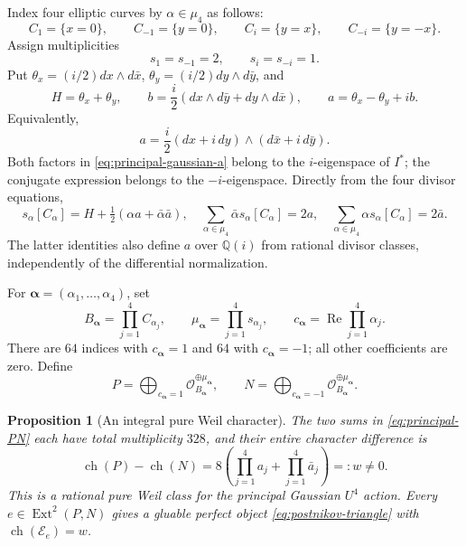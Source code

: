 \documentclass[11pt]{article}
\newtheorem{proposition}[theorem]{Proposition}
\theoremstyle{definition}
\theoremstyle{remark}
\begin{document}
Index four elliptic curves by $\alpha\in\mu_4$ as follows:
\[
 C_1=\{x=0\},\qquad C_{-1}=\{y=0\},\qquad
 C_i=\{y=x\},\qquad C_{-i}=\{y=-x\}.
\]
Assign multiplicities
\[
 s_1=s_{-1}=2,\qquad s_i=s_{-i}=1.
\]
Put $\theta_x=(i/2)dx\wedge d\bar x$,
$\theta_y=(i/2)dy\wedge d\bar y$, and
\[
 H=\theta_x+\theta_y,\qquad
 b=\frac i2(dx\wedge d\bar y+dy\wedge d\bar x),\qquad
 a=\theta_x-\theta_y+ib.
\]
Equivalently,
\begin{equation}
 \label{eq:principal-gaussian-a}
 a=\frac i2(dx+i\,dy)\wedge(d\bar x+i\,d\bar y).
\end{equation}
Both factors in \eqref{eq:principal-gaussian-a} belong to the
$i$-eigenspace of $I^*$; the conjugate expression belongs to the
$-i$-eigenspace.  Directly from the four divisor equations,
\begin{equation}
 \label{eq:principal-four-divisors}
 s_\alpha[C_\alpha]
   =H+\tfrac12(\alpha a+\bar\alpha\bar a),
 \quad
 \sum_{\alpha\in\mu_4}\bar\alpha s_\alpha[C_\alpha]=2a,
 \quad
 \sum_{\alpha\in\mu_4}\alpha s_\alpha[C_\alpha]=2\bar a.
\end{equation}
The latter identities also define $a$ over $\mathbb Q(i)$ from
rational divisor classes, independently of the differential
normalization.

For $\boldsymbol\alpha=(\alpha_1,\ldots,\alpha_4)$, set
\[
 B_{\boldsymbol\alpha}=\prod_{j=1}^4C_{\alpha_j},\qquad
 \mu_{\boldsymbol\alpha}=\prod_{j=1}^4s_{\alpha_j},\qquad
 c_{\boldsymbol\alpha}=\operatorname{Re}\prod_{j=1}^4\alpha_j.
\]
There are $64$ indices with $c_{\boldsymbol\alpha}=1$ and $64$
with $c_{\boldsymbol\alpha}=-1$; all other coefficients are zero.
Define
\begin{equation}
 \label{eq:principal-PN}
 P=\bigoplus_{c_{\boldsymbol\alpha}=1}
       \mathcal O_{B_{\boldsymbol\alpha}}^{\oplus\mu_{\boldsymbol\alpha}},
 \qquad
 N=\bigoplus_{c_{\boldsymbol\alpha}=-1}
       \mathcal O_{B_{\boldsymbol\alpha}}^{\oplus\mu_{\boldsymbol\alpha}}.
\end{equation}

\begin{proposition}[An integral pure Weil character]
\label{prop:principal-graph-character}
The two sums in \eqref{eq:principal-PN} each have total
multiplicity $328$, and their entire character difference is
\begin{equation}
 \label{eq:principal-graph-weil}
 \operatorname{ch}(P)-\operatorname{ch}(N)
 =8\left(\prod_{j=1}^4a_j+\prod_{j=1}^4\bar a_j\right)=:w\ne0.
\end{equation}
This is a rational pure Weil class for the principal Gaussian
$U^4$ action.  Every $e\in\operatorname{Ext}^2(P,N)$ gives a
gluable perfect object \eqref{eq:postnikov-triangle} with
$\operatorname{ch}(\mathcal E_e)=w$.
\end{proposition}
\end{document}
